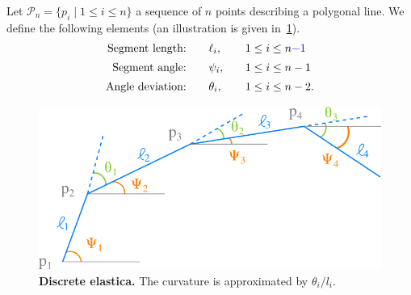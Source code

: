 Let $\mathcal{P}_n=\{p_i \; | \; 1 \leq i \leq n\}$ a sequence of $n$ points describing a polygonal line. We define the following elements (an illustration is given in~\cref{ch3:fig:bruckstein-polygonal-line}).
\begin{align*}
\begin{array}{rll}
\text{Segment length:} & \quad \ell_i,& \quad 1 \leq i \leq n{\color{blue}{-1}}\\[0.5em]
\text{Segment angle:} & \quad \psi_i,& \quad 1 \leq i \leq n-1\\[0.5em]
\text{Angle deviation:} & \quad \theta_i,& \quad 1 \leq i \leq n-2.
\end{array}
\end{align*}
%
\begin{figure}
\center
\includegraphics[scale=0.6]{figures/chapter3/bruckstein/polygonal-line.png}
\caption{\textbf{Discrete elastica.} The curvature is approximated by $\theta_i/l_i$.}
\label{ch3:fig:bruckstein-polygonal-line}
\end{figure}

